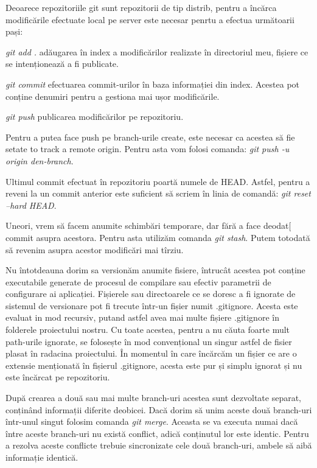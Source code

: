 	Deoarece repozitoriile git sunt repozitorii de tip distrib, pentru a încărca modificările efectuate local pe server este necesar penrtu a efectua următoarii pași: \begin{list}{•}{}
	\item  \textit{git add .} adăugarea în index a modificărilor realizate în directoriul meu, fișiere ce se intenționează a fi publicate.
	\item  \textit{git commit} efectuarea commit-urilor în baza informației din index. Acestea pot conține denumiri pentru a gestiona mai ușor modificările.
	\item \textit{git push} publicarea modificărilor pe repozitoriu.
	\end{list}
	
	Pentru a putea face push pe branch-urile create, este necesar ca acestea să fie setate to track a remote origin. Pentru asta vom folosi comanda: \textit{git push -u origin den-branch}. 
	
	Ultimul commit efectuat în repozitoriu poartă numele de HEAD. Astfel, pentru a reveni la un commit anterior este suficient să scriem în linia de comandă: \textit{git reset --hard HEAD}.
	
	Uneori, vrem să facem anumite schimbări temporare, dar fără a face deodat[ commit asupra acestora. Pentru asta utilizăm comanda \textit{git stash}. Putem totodată să revenim asupra acestor modificări mai tîrziu.
	
	Nu întotdeauna dorim sa versionăm anumite fisiere, întrucât acestea pot conține executabile generate de procesul de compilare sau efectiv parametrii de configurare ai aplicației. Fișierele sau directoarele ce se doresc a fi ignorate de sistemul de versionare pot fi trecute într-un fișier numit .gitignore. Acesta este evaluat in mod recursiv, putand astfel avea mai multe fișiere .gitignore în folderele proiectului nostru. Cu toate acestea, pentru a nu căuta foarte mult path-urile ignorate, se folosește în mod convențional un singur astfel de fisier plasat în radacina proiectului. În momentul în care încărcăm un fișier ce are o extensie menționată în fișierul .gitignore, acesta este pur și simplu ignorat și nu este încărcat pe repozitoriu.
	
	După crearea a două sau mai multe branch-uri acestea sunt dezvoltate separat, conținând informații diferite deobicei. Dacă dorim să unim aceste două branch-uri într-unul singut folosim comanda \textit{git merge}. Aceasta se va executa numai dacă între aceste branch-uri nu există conflict, adică conținutul lor este identic. Pentru a rezolva aceste conflicte trebuie sincronizate cele două branch-uri, ambele să aibă informație identică.
	
